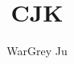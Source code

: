 \documentclass[draft]{amsart}
\begin{document}
\title{CJK}
\author{WarGrey Ju}
\maketitle


\end{document}
